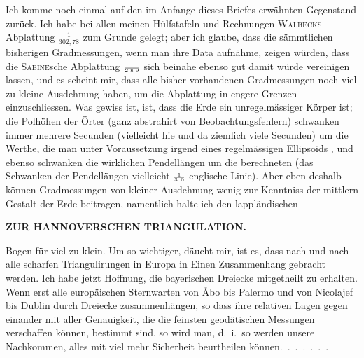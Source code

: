 \par\noindent\hspace*{\parindent}Ich komme noch einmal auf den im Anfange dieses Briefes erwähnten Gegenstand zurück.
Ich habe bei allen meinen Hülfstafeln und Rechnungen \textsc{Walbecks} Abplattung \(\frac{1}{302{,}78}\) zum Grunde gelegt; aber ich glaube, dass die sämmtlichen bisherigen Gradmessungen, wenn man ihre Data  aufnähme, zeigen würden, dass die \textsc{Sabine}sche Abplattung \(\scriptstyle\frac{1}{2\mkern5mu 8\mkern5mu 9}\) sich beinahe ebenso gut damit würde vereinigen lassen, und es scheint mir, dass alle bisher vorhandenen Gradmessungen noch viel zu kleine Ausdehnung haben, um die Abplattung in engere Grenzen einzuschliessen.
Was gewiss ist, ist, dass die Erde ein unregelmässiger Körper ist; die Polhöhen der Örter (ganz abstrahirt von Beobachtungsfehlern) schwanken immer mehrere Secunden (vielleicht hie und da ziemlich viele Secunden) um die Werthe, die man unter Voraussetzung irgend eines regelmässigen Ellipsoids , und ebenso schwanken die wirklichen Pendellängen um die berechneten (das  Schwanken der Pendellängen vielleicht \(\scriptstyle\frac{1}{3\mkern7mu 0}\) englische Linie).
Aber eben deshalb können Gradmessungen von kleiner Ausdehnung wenig zur Kenntniss der mittlern Gestalt der Erde beitragen, namentlich halte ich den lappländischen
\par\clearpage
\noindent\null\hfill{\small\textbf{ZUR HANNOVERSCHEN TRIANGULATION.}}\hfill{}\par\medskip
\noindent Bogen für viel zu klein.
Um so wichtiger, däucht mir, ist es, dass nach und nach alle scharfen Triangulirungen in Europa in Einen Zusammenhang gebracht werden.
Ich habe jetzt Hoffnung, die bayerischen Dreiecke mitgetheilt zu erhalten.
Wenn erst alle europäischen Sternwarten von Åbo bis Palermo und von Nicolajef bis Dublin durch Dreiecke zusammenhängen, so dass ihre relativen Lagen gegen einander mit aller Genauigkeit, die die feinsten geodätischen Messungen verschaffen können, bestimmt sind, so wird man, d.~i.\ so werden unsere Nachkommen, alles mit viel mehr Sicherheit beurtheilen \mbox{können.\ .\ .\ .\ .\ .\ .}
